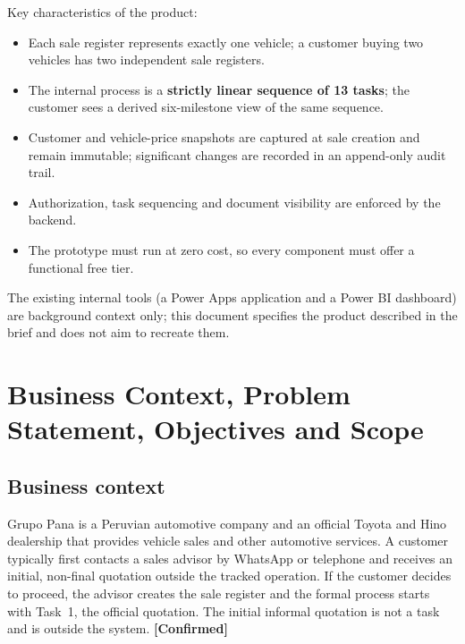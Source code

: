 \documentclass[11pt,a4paper]{article}
\newcommand{\tagconf}{\textcolor{green!45!black}{\textbf{[Confirmed]}}}
\begin{document}
Key characteristics of the product:

\begin{itemize}
	\item Each sale register represents exactly one vehicle; a customer buying two
	      vehicles has two independent sale registers.
	\item The internal process is a \textbf{strictly linear sequence of 13 tasks};
	      the customer sees a derived six-milestone view of the same sequence.
	\item Customer and vehicle-price snapshots are captured at sale creation and
	      remain immutable; significant changes are recorded in an append-only
	      audit
	      trail.
	\item Authorization, task sequencing and document visibility are enforced by
	      the backend.
	\item The prototype must run at zero cost, so every component must offer a
	      functional free tier.
\end{itemize}

The existing internal tools (a Power Apps application and a Power BI dashboard)
are background context only; this document specifies the product described in
the brief and does not aim to recreate them.

\section{Business Context, Problem Statement, Objectives and Scope}

\subsection{Business context}

Grupo Pana is a Peruvian automotive company and an official Toyota and Hino
dealership that provides vehicle sales and other automotive services. A customer
typically first contacts a sales advisor by WhatsApp or telephone and receives
an initial, non-final quotation outside the tracked operation. If the customer
decides to proceed, the advisor creates the sale register and the formal process
starts with Task~1, the official quotation. The initial informal quotation is
not a task and is outside the system. \tagconf{}
\end{document}
